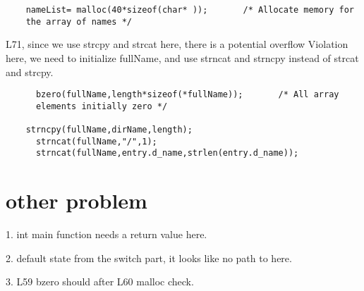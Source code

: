 \documentclass[12pt]{article}
\begin{document}
\begin{lstlisting}
    nameList= malloc(40*sizeof(char* ));       /* Allocate memory for
    the array of names */ 
\end{lstlisting}

L71, since we use strcpy and strcat here, there is a potential
overflow Violation here, we need to initialize fullName, and use
strncat and strncpy instead of strcat and strcpy.

\begin{lstlisting}
      bzero(fullName,length*sizeof(*fullName));       /* All array
      elements initially zero */ 
  
    strncpy(fullName,dirName,length);
      strncat(fullName,"/",1);
      strncat(fullName,entry.d_name,strlen(entry.d_name));

\end{lstlisting}

\section{other problem}
1.
int main function needs a return value here. 

2. 
default state from the switch part,
it looks like no path to here.

3.
L59 bzero should after L60 malloc check.
\end{document}
